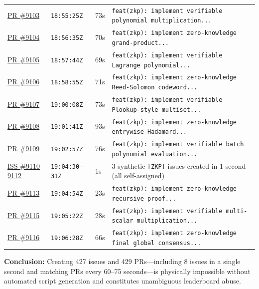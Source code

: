 \documentclass[11pt,a4paper]{article}
\begin{document}
\begin{center}
\begin{tabular}{@{}lll p{7.8cm}@{}}
\href{https://github.com/SatyamPandey-07/WorkSphere/pull/9103}{PR \#9103} & \texttt{18:55:25Z} & 73s & \texttt{feat(zkp): implement verifiable polynomial multiplication...} \\
\href{https://github.com/SatyamPandey-07/WorkSphere/pull/9104}{PR \#9104} & \texttt{18:56:35Z} & 70s & \texttt{feat(zkp): implement zero-knowledge grand-product...} \\
\href{https://github.com/SatyamPandey-07/WorkSphere/pull/9105}{PR \#9105} & \texttt{18:57:44Z} & 69s & \texttt{feat(zkp): implement verifiable Lagrange polynomial...} \\
\href{https://github.com/SatyamPandey-07/WorkSphere/pull/9106}{PR \#9106} & \texttt{18:58:55Z} & 71s & \texttt{feat(zkp): implement zero-knowledge Reed-Solomon codeword...} \\
\href{https://github.com/SatyamPandey-07/WorkSphere/pull/9107}{PR \#9107} & \texttt{19:00:08Z} & 73s & \texttt{feat(zkp): implement verifiable Plookup-style multiset...} \\
\href{https://github.com/SatyamPandey-07/WorkSphere/pull/9108}{PR \#9108} & \texttt{19:01:41Z} & 93s & \texttt{feat(zkp): implement zero-knowledge entrywise Hadamard...} \\
\href{https://github.com/SatyamPandey-07/WorkSphere/pull/9109}{PR \#9109} & \texttt{19:02:57Z} & 76s & \texttt{feat(zkp): implement verifiable batch polynomial evaluation...} \\
\href{https://github.com/SatyamPandey-07/WorkSphere/issues/9110}{ISS \#9110}--\href{https://github.com/SatyamPandey-07/WorkSphere/issues/9112}{9112} & \texttt{19:04:30--31Z} & 1s & 3 synthetic \texttt{[ZKP]} issues created in 1 second (all self-assigned) \\
\href{https://github.com/SatyamPandey-07/WorkSphere/pull/9113}{PR \#9113} & \texttt{19:04:54Z} & 23s & \texttt{feat(zkp): implement zero-knowledge recursive proof...} \\
\href{https://github.com/SatyamPandey-07/WorkSphere/pull/9115}{PR \#9115} & \texttt{19:05:22Z} & 28s & \texttt{feat(zkp): implement verifiable multi-scalar multiplication...} \\
\href{https://github.com/SatyamPandey-07/WorkSphere/pull/9116}{PR \#9116} & \texttt{19:06:28Z} & 66s & \texttt{feat(zkp): implement zero-knowledge final global consensus...} \\
\bottomrule
\end{tabular}
\end{center}
\textbf{Conclusion:} Creating 427 issues and 429 PRs—including 8 issues in a single second and matching PRs every 60--75 seconds—is physically impossible without automated script generation and constitutes unambiguous leaderboard abuse.
\end{document}
